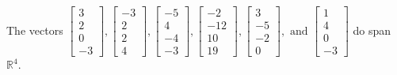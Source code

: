 \begin{exercise}
\begin{exerciseStatement}
  \end{exerciseStatement}
  \begin{exerciseAnswer}
   The vectors \(\left[\begin{array}{r}
3 \\
2 \\
0 \\
-3
\end{array}\right] , \left[\begin{array}{r}
-3 \\
2 \\
2 \\
4
\end{array}\right] , \left[\begin{array}{r}
-5 \\
4 \\
-4 \\
-3
\end{array}\right] , \left[\begin{array}{r}
-2 \\
-12 \\
10 \\
19
\end{array}\right] , \left[\begin{array}{r}
3 \\
-5 \\
-2 \\
0
\end{array}\right] , \text{ and } \left[\begin{array}{r}
1 \\
4 \\
0 \\
-3
\end{array}\right]\) 
  	 do  
	span \(\mathbb{R}^4\).
  


  \end{exerciseAnswer}
\end{exercise}